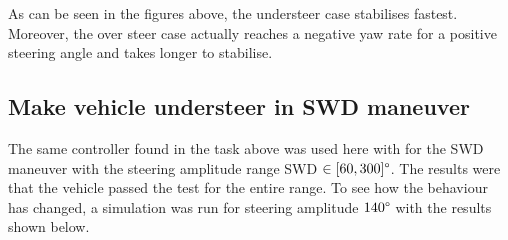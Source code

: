 As can be seen in the figures above, the understeer case stabilises fastest. Moreover, the over steer case actually reaches a negative yaw rate for a positive steering angle and takes longer to stabilise. 

\subsection{Make vehicle understeer in SWD maneuver}

The same controller found in the task above was used here with for the SWD maneuver with the steering amplitude range SWD $\in[60,300]\degree$. The results were that the vehicle passed the test for the entire range. To see how the behaviour has changed, a simulation was run for steering amplitude $140\degree$ with the results shown below. 

